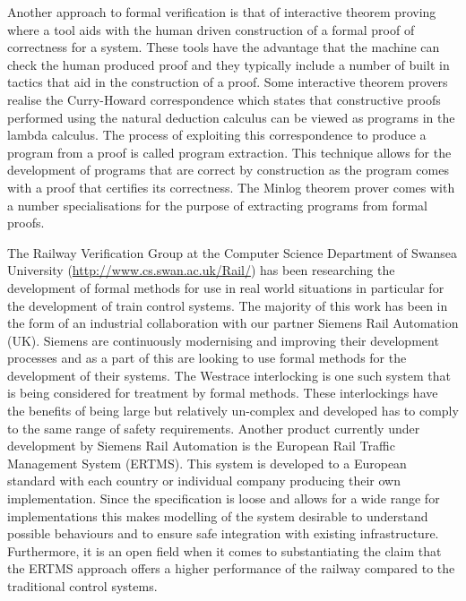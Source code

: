 Another approach to formal verification is that of interactive theorem proving \cite{HG09,SSD06} where a tool aids with the human driven construction of a formal proof of correctness for a system. These tools have the advantage that the machine can check the human produced proof and they typically include a number of built in tactics that aid in the construction of a proof. Some interactive theorem provers realise the Curry-Howard correspondence \cite{HC34, HC58, WH80} which states that constructive proofs performed using the natural deduction calculus can be viewed as programs in the lambda calculus.  The process of exploiting this correspondence to produce a program from a proof is called program extraction. This technique allows for the development of programs that are correct by construction as the program comes with a proof that certifies its correctness. The Minlog theorem prover comes with a number specialisations for the purpose of extracting programs from formal proofs.
\begin{comment}
\textbf{Note: Add something about program extraction here.}
Alternatively to automatic techniques for verification there are also interactive theorem provers which employ man-machine collaboration in order to prove properties over a system.
Program extraction is another verification technique which allows the production of correct by construction computer programs. It is based around the Curry-Howard correspondence \cite{} which states that constructive proofs performed using the natural deduction calculus can be viewed as programs in the lambda calculus. 
\end{comment}


The Railway Verification Group at the Computer Science Department of Swansea University (\url{http://www.cs.swan.ac.uk/Rail/}) has been researching the development of formal methods for use in real world situations in particular for the development of train control systems. The majority of this work has been in the form of an industrial collaboration with our partner Siemens Rail Automation (UK). Siemens are continuously modernising and improving their development processes and as a part of this are looking to use formal methods for the development of their systems. The Westrace interlocking is one such system that is being considered for treatment by formal methods. These interlockings have the benefits of being large but relatively un-complex and developed has to comply to the same range of safety requirements.  Another product currently under development by Siemens Rail Automation is the European Rail Traffic Management System (ERTMS). This system is developed to a European  standard with each country or individual company producing their own implementation. Since the specification is loose and allows for a wide range for implementations this makes modelling of the system desirable to understand possible behaviours and to ensure safe integration with existing infrastructure. Furthermore, it is an open field  when it comes to substantiating the claim that the ERTMS approach offers a higher performance of the railway compared to the traditional control systems.




